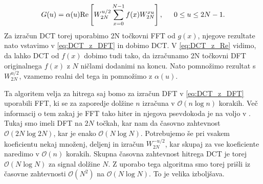 \documentclass[a4paper,12pt,openright]{book}
\begin{document}
\begin{equation}
  G(u) = \alpha(u)\mbox{Re}\left[ W_{2N}^{u/2} \sum_{x=0}^{N-1} f(x) W_{2N}^{xu} \right], \indent 0 \leq u \leq 2N-1.
\label{eq:DCT_z_Re}
\end{equation}
Za izračun DCT torej uporabimo 2N točkovni FFT od $g(x)$, njegove rezultate nato vstavimo v \eqref{eq:DCT_z_DFT} in dobimo DCT. V \eqref{eq:DCT_z_Re} vidimo, da lahko DCT od $f(x)$ dobimo tudi tako, da izračunamo 2N točkovni DFT originalnega $f(x)$ z $N$ ničlami dodanimi na koncu. Nato pomnožimo rezultat s $W_{2N}^{u/2}$, vzamemo realni del tega in pomnožimo z $\alpha(u)$.\par
Ta algoritem velja za hitrega saj bomo za izračun DFT v \eqref{eq:DCT_z_DFT} uporabili FFT, ki se za zaporedje dolžine $n$ izračuna v $\mathcal{O}(n\log{}n)$ korakih. Več informacij o tem zakaj je FFT tako hiter in njegova psevdokoda je na voljo v \cite{Kozak_1997}. Tukaj smo imeli DFT na $2N$ točkah, kar nam da časovno zahtevnost $\mathcal{O}(2N\log{}2N)$, kar je enako $\mathcal{O}(N\log{}N)$. Potrebujemo še pri vsakem koeficientu nekaj množenj, deljenj in izračun $W_{2N}^{-u/2}$, kar skupaj za vse koeficiente naredimo v $\mathcal{O}(n)$ korakih. Skupna časovna zahtevnost hitrega DCT je torej $\mathcal{O}(N\log{}N)$ za signal dolžine $N$. Z uporabo tega algoritma smo torej prišli iz časovne zahtevnosti $\mathcal{O}(N^2)$ na $\mathcal{O}(N\log{}N)$. To je velika izboljšava.
\end{document}
